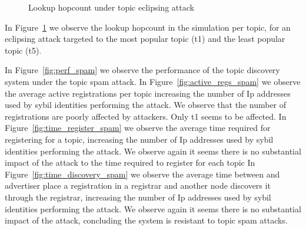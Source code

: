 \begin{figure}[!h]
\centering
{} 
\hspace{-0.16cm}
 \caption{Lookup hopcount under topic eclipsing attack} 
\label{fig:lookup_eclipse}
\vspace{-0.15in}
\end{figure}   

In Figure~\ref{fig:lookup_eclipse} we observe the lookup hopcount in the simulation per topic,  for an eclipsing attack targeted to the most popular topic (t1) and the least popular topic (t5).

In Figure~\ref{fig:perf_spam} we observe the performance of the topic discovery system under  the topic spam attack.
In Figure~\ref{fig:active_regs_spam} we observe the average active registrations per topic increasing the number of Ip addresses used by sybil identities performing the attack.  
We observe that the number of registrations are  poorly affected by attackers. 
Only t1 seems to be affected.
In Figure~\ref{fig:time_register_spam} we observe the average time required for registering for a topic,  increasing the number of Ip addresses used by sybil identities performing the attack.  
We observe again it seems there is no substantial impact of the attack to the time required to register for each topic
In Figure~\ref{fig:time_discovery_spam} we observe the average time between and advertiser place a registration in a registrar and another node discovers it through the registrar,  increasing the number of Ip addresses used by sybil identities performing the attack.  
We observe again it seems there is no substantial impact of the attack, concluding the system is resistant to topic spam attacks.

